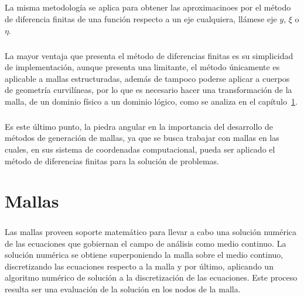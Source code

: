 \documentclass[letterpaper, openright, 12pt]{book}
\begin{document}
    \paragraph*{}
    La misma metodología se aplica para obtener las aproximacinoes por el método
    de diferencia finitas de una función respecto a un eje cualquiera, llámese
    eje $y$, $\xi$ o $\eta$.

    \paragraph*{}
    La mayor ventaja que presenta el método de diferencias finitas es su
    simplicidad de implementación, aunque presenta una limitante, el método
    únicamente es aplicable a mallas estructuradas, además de tampoco poderse
    aplicar a cuerpos de geometría curvilíneas, por lo que es necesario hacer una
    transformación de la malla, de un dominio físico a un dominio lógico, como
    se analiza en el capítulo~\ref{chap:mallas}.

    \paragraph*{}
    Es este último punto, la piedra angular en la importancia del desarrollo de
    métodos de generación de mallas, ya que se busca trabajar con mallas en las
    cuales, en sus sistema de coordenadas computacional, pueda ser aplicado el
    método de diferencias finitas para la solución de problemas.

    \chapter{Mallas}
    \label{chap:mallas}
    \paragraph*{}
    Las mallas proveen soporte matemático para llevar a cabo una solución
    numérica de las ecuaciones que gobiernan el campo de análisis como medio
    continuo. La solución numérica se obtiene superponiendo la malla sobre el
    medio continuo, discretizando las ecuaciones respecto a la malla y por
    último, aplicando un algoritmo numérico de solución a la discretización de
    las ecuaciones. Este proceso resulta ser una evaluación de la solución en
    los nodos de la malla.
\end{document}
